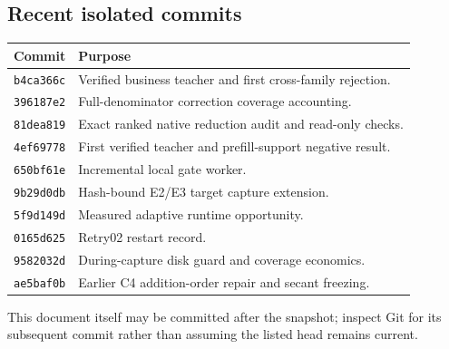 \documentclass[11pt,a4paper]{article}
\begin{document}
\subsection{Recent isolated commits}
\begin{longtable}{ll}
\toprule Commit & Purpose \\ \midrule
\texttt{b4ca366c} & Verified business teacher and first cross-family rejection. \\
\texttt{396187e2} & Full-denominator correction coverage accounting. \\
\texttt{81dea819} & Exact ranked native reduction audit and read-only checks. \\
\texttt{4ef69778} & First verified teacher and prefill-support negative result. \\
\texttt{650bf61e} & Incremental local gate worker. \\
\texttt{9b29d0db} & Hash-bound E2/E3 target capture extension. \\
\texttt{5f9d149d} & Measured adaptive runtime opportunity. \\
\texttt{0165d625} & Retry02 restart record. \\
\texttt{9582032d} & During-capture disk guard and coverage economics. \\
\texttt{ae5baf0b} & Earlier C4 addition-order repair and secant freezing. \\
\bottomrule
\end{longtable}
This document itself may be committed after the snapshot; inspect Git for its
subsequent commit rather than assuming the listed head remains current.
\end{document}

